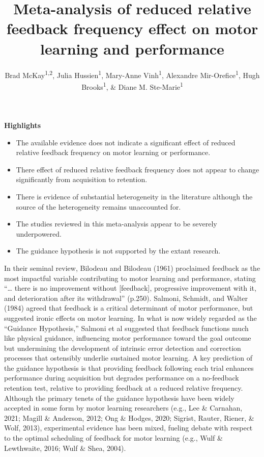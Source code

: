 \documentclass[
  english,
  man, donotrepeattitle,floatsintext]{apa7}
\title{Meta-analysis of reduced relative feedback frequency effect on motor learning and performance}
\author{Brad McKay\textsuperscript{1,2}, Julia Hussien\textsuperscript{1}, Mary-Anne Vinh\textsuperscript{1}, Alexandre Mir-Orefice\textsuperscript{1}, Hugh Brooks\textsuperscript{1}, \& Diane M. Ste-Marie\textsuperscript{1}}
\date{}
\affiliation{\vspace{0.5cm}\textsuperscript{1} School of Human Kinetics, University of Ottawa\\\textsuperscript{2} Department of Kinesiology, McMaster University}
\providecommand{\tightlist}{%
  \setlength{\itemsep}{0pt}\setlength{\parskip}{0pt}}
\begin{document}
\maketitle

\textbf{Highlights}

\begin{itemize}
\tightlist
\item
  The available evidence does not indicate a significant effect of reduced relative feedback frequency on motor learning or performance.
\item
  There effect of reduced relative feedback frequency does not appear to change significantly from acquisition to retention.
\item
  There is evidence of substantial heterogeneity in the literature although the source of the heterogeneity remains unaccounted for.
\item
  The studies reviewed in this meta-analysis appear to be severely underpowered.
\item
  The guidance hypothesis is not supported by the extant research.
\end{itemize}

\newpage

In their seminal review, Bilodeau and Bilodeau (1961) proclaimed feedback as the most impactful variable contributing to motor learning and performance, stating ``\ldots{} there is no improvement without {[}feedback{]}, progressive improvement with it, and deterioration after its withdrawal'' (p.250). Salmoni, Schmidt, and Walter (1984) agreed that feedback is a critical determinant of motor performance, but suggested ironic effects on motor learning. In what is now widely regarded as the ``Guidance Hypothesis,'' Salmoni et al suggested that feedback functions much like physical guidance, influencing motor performance toward the goal outcome but undermining the development of intrinsic error detection and correction processes that ostensibly underlie sustained motor learning. A key prediction of the guidance hypothesis is that providing feedback following each trial enhances performance during acquisition but degrades performance on a no-feedback retention test, relative to providing feedback at a reduced relative frequency. Although the primary tenets of the guidance hypothesis have been widely accepted in some form by motor learning researchers (e.g., Lee \& Carnahan, 2021; Magill \& Anderson, 2012; Ong \& Hodges, 2020; Sigrist, Rauter, Riener, \& Wolf, 2013), experimental evidence has been mixed, fueling debate with respect to the optimal scheduling of feedback for motor learning (e.g., Wulf \& Lewthwaite, 2016; Wulf \& Shea, 2004).
\end{document}
